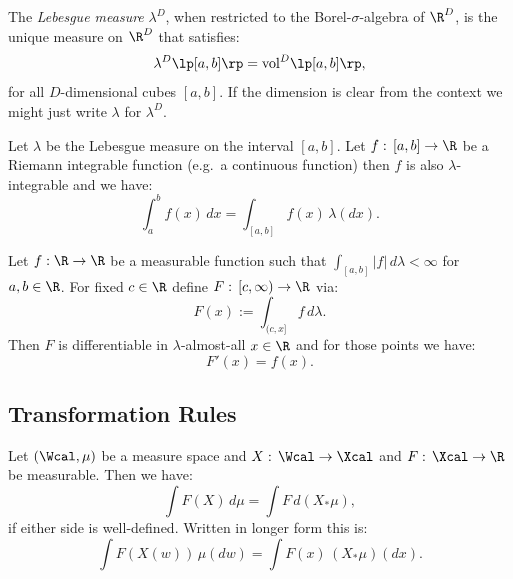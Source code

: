 \begin{Thm}
 The \emph{Lebesgue measure} $\lambda^D$, when restricted to the Borel-$\sigma$-algebra of $\R^D$,
  is the unique measure on $\R^D$ that satisfies:
    \[ \lambda^D\lp [a,b] \rp = \mathrm{vol}^D\lp [a,b] \rp,     \]
    for all $D$-dimensional cubes $[a,b]$.
    If the dimension is clear from the context we might just write $\lambda$ for $\lambda^D$.
\end{Thm}

\begin{Thm} Let $\lambda$ be the Lebesgue measure on the interval $[a,b]$.  Let $f:\, [a,b] \to \R$ be a Riemann integrable function (e.g.\ a continuous function) then $f$ is also $\lambda$-integrable and we have:
    \[ \int_a^b f(x)\,dx = \int_{[a,b]}  f(x)\, \lambda(dx). \]
\end{Thm}

\begin{Thm}
    Let $f: \R \to \R$ be a measurable function such that $\int_{[a,b]}  |f| \,d\lambda < \infty$ for $a,b \in \R$. %
            For fixed $c \in \R$ define $F:\, [c,\infty) \to \R$ via:
            \[ F(x) := \int_{(c,x]} f\,d\lambda.  \]
            Then $F$ is differentiable in  $\lambda$-almost-all $x \in \R$ and for those points we have:
            \[ F'(x) = f(x).\]
\end{Thm}

\subsection{Transformation Rules}


\begin{Thm}
    Let $(\Wcal,\mu)$ be a measure space and $X :\,\Wcal \to \Xcal$ and $F:\, \Xcal \to \R$ be measurable.
    Then we have:
    \[ \int F(X)\,d\mu = \int F\, d(X_*\mu),  \]
    if either side is well-defined.
    Written in longer form this is:
    \[ \int F(X(w))\,\mu(dw) = \int F(x)\, (X_*\mu)(dx).  \]
\end{Thm}



